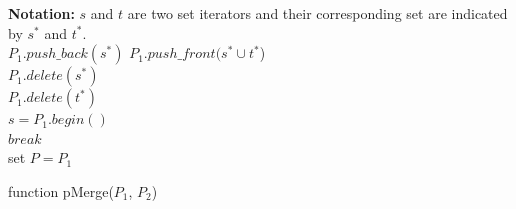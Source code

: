 \documentclass[12pt]{article}
\begin{document}
\begin{algorithm}[H]
\textbf{Notation:} $s$ and $t$ are two set iterators and their corresponding set are indicated by $s^*$ and $t^*$.\\ 
\nl {}
{
\nl $P_1.push\_back(s^*)$
}
\nl {}
{
\nl {}
{
 \nl {}
  {
\nl  	$  P_1.push\_front(s^*\cup t^*$) \\
\nl$P_1.delete(s^*)$\\
  \nl $P_1.delete(t^*)$\\
  \nl $s=P_1.begin()$\\
   \nl$break$\\
  }
}
}
\nl set $P=P_1$\\
\caption{function pMerge($P_1$, $P_2$)}
\end{algorithm}
\end{document}
